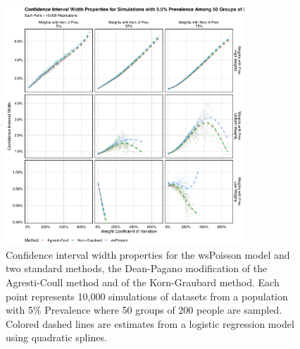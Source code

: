\documentclass[AMA,STIX1COL]{WileyNJD-v2}
\begin{document}
\begin{figure}
\centering
\includegraphics[width=0.8\textwidth]{figures/perfect_confidence_interval_width_50_groups_0_05_prev}
\caption{Confidence interval width properties for the wsPoisson model and two standard methods, the Dean-Pagano modification of the Agresti-Coull method and of the Korn-Graubard method.
Each point represents 10,000 simulations of datasets from a population with 5\% Prevalence where 50 groups of 200 people are sampled.
Colored dashed lines are estimates from a logistic regression model using quadratic splines.}
\label{fig:perfect_confidence_interval_width_50_groups_0_05_prev}
\end{figure}
\end{document}
